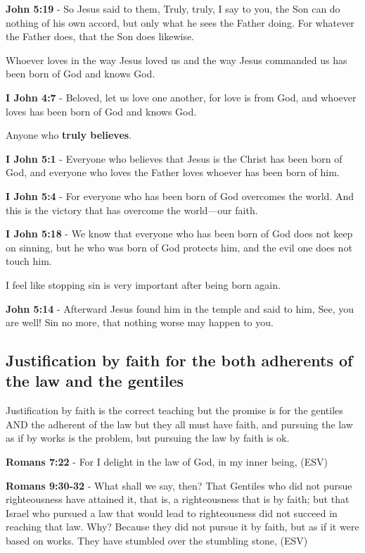 \documentclass[11pt]{article}
\begin{document}
\textbf{John 5:19} - So Jesus said to them, Truly, truly, I say to you, the Son can do nothing of his own accord, but only what he sees the Father doing. For whatever the Father does, that the Son does likewise.

Whoever loves in the way Jesus loved us and the way Jesus commanded us has been born of God and knows God.

\textbf{I John 4:7} - Beloved, let us love one another, for love is from God, and whoever loves has been born of God and knows God.

Anyone who \textbf{truly believes}.

\textbf{I John 5:1} - Everyone who believes that Jesus is the Christ has been born of God, and everyone who loves the Father loves whoever has been born of him.

\textbf{I John 5:4} - For everyone who has been born of God overcomes the world. And this is the victory that has overcome the world—our faith.

\textbf{I John 5:18} - We know that everyone who has been born of God does not keep on sinning, but he who was born of God protects him, and the evil one does not touch him.

I feel like stopping sin is very important after being born again.

\textbf{John 5:14} - Afterward Jesus found him in the temple and said to him, See, you are well! Sin no more, that nothing worse may happen to you.

\subsection{Justification by faith for the both adherents of the law and the gentiles}
\label{sec:orgfe7dfe4}
Justification by faith is the correct teaching but the promise is for the gentiles AND the adherent of the law but they all must have faith, and pursuing the law as if by works is the problem, but pursuing the law by faith is ok.

\textbf{Romans 7:22} - For I delight in the law of God, in my inner being, (ESV)

\textbf{Romans 9:30-32} - What shall we say, then? That Gentiles who did not pursue righteousness have attained it, that is, a righteousness that is by faith; but that Israel who pursued a law that would lead to righteousness did not succeed in reaching that law. Why? Because they did not pursue it by faith, but as if it were based on works. They have stumbled over the stumbling stone, (ESV)
\end{document}
